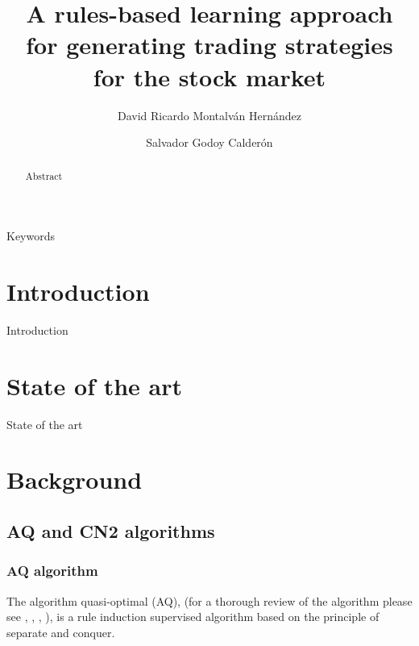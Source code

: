 \documentclass[preprint,3p,twocolumn]{elsarticle}
\begin{document}
\begin{frontmatter}
  \title{A rules-based learning approach for generating trading strategies for the stock market}
  
  \author[1]{David Ricardo Montalván Hernández }
  
  \author[1]{Salvador Godoy Calderón}
  
  \address[1]{Centro de Investigación en Computación, Instituto Politécnico Nacional,
  Av. Juan de Dios Bátiz e/ M.O. de Mendizábal s/n, Nva Ind. Vallejo, 07738, Mexico City, Mexico}
  
  
  \begin{abstract}
  Abstract
  \end{abstract}
  
  \begin{keyword}
  Keywords
  \end{keyword}
  
\end{frontmatter}

\section{Introduction}
\label{sec:introduction}
Introduction

\section{State of the art}
\label{sec:state of the art}
State of the art

\section{Background}
\label{sec:background}

\subsection{AQ and CN2 algorithms}
\label{subsec:algorithms}

\subsubsection{AQ algorithm}
\label{subsubsec: aq algorithm}
The algorithm quasi-optimal (AQ), (for a thorough review of the algorithm please see \cite{michalski1969quasi}, \cite{AQMichalski1991}, \cite{AQCervone2010}, \cite{AQWojtusiak2012}), is a rule induction supervised algorithm based on the principle of separate and conquer.
\end{document}
